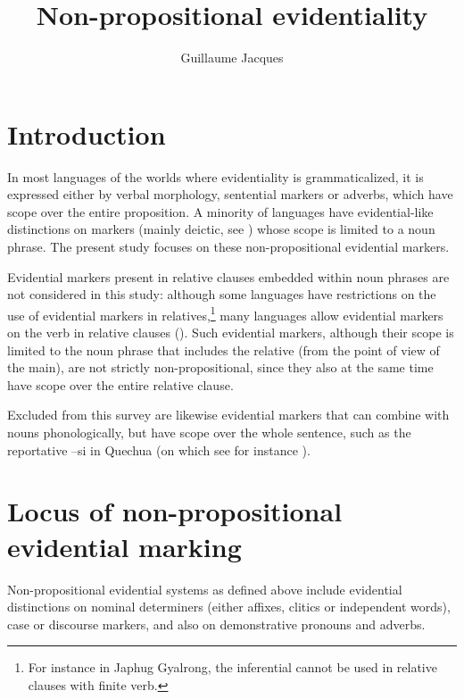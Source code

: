 \documentclass[oneside,a4paper,11pt]{article}
\newcommand{\ipa}[1]{{\phon \mbox{#1}}} %
\begin{document}
 
\sloppy

\title{Non-propositional evidentiality}
\author{Guillaume Jacques}
\maketitle

\section{Introduction}
In most languages of the worlds where evidentiality is grammaticalized, it is expressed either by verbal morphology, sentential markers or adverbs, which have scope over the entire proposition. A minority of languages have evidential-like distinctions on markers (mainly deictic, see \citealt[130]{aikhenvald06}) whose scope is limited to a noun phrase. The present study focuses on these non-propositional evidential markers.

Evidential markers present in relative clauses embedded within noun phrases are not considered in this study: although some languages have restrictions on the use of evidential markers in relatives,\footnote{For instance in Japhug Gyalrong, the inferential cannot be used in relative clauses with finite verb.} many languages allow evidential markers on the verb in relative clauses (\citealt[253-6]{aikhenvald06}). Such evidential markers, although their scope is limited to the noun phrase that includes the relative (from the point of view of the main), are not strictly non-propositional, since they also at the same time have scope over the entire relative clause.


Excluded from this survey are likewise evidential markers that can combine with nouns phonologically, but have scope over the whole sentence, such as the reportative  \ipa{--si} in Quechua (on which see for instance \citealt{faller02cuzco}).

 \section{Locus of non-propositional evidential marking} \label{sec:loc}
Non-propositional evidential systems as defined above include evidential distinctions on nominal determiners (either affixes, clitics or independent words), case or discourse markers, and also on demonstrative pronouns and adverbs.
\end{document}

